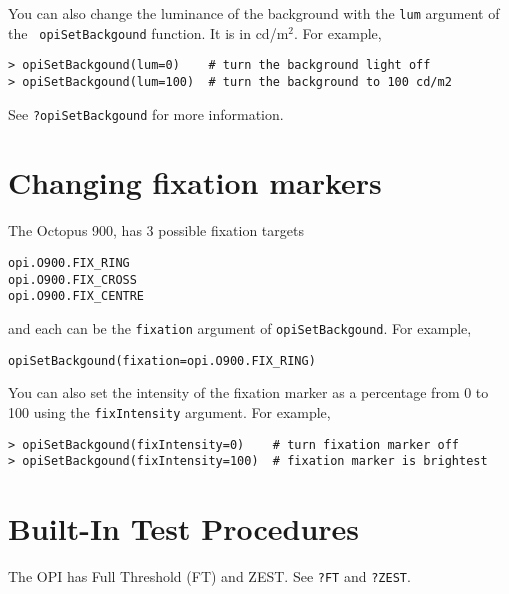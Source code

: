 \documentclass{article}
\begin{document}
You can also change the luminance of the background with the {\tt lum} argument of the {\tt
opiSetBackgound} function. It is in cd/m$^2$.
For example,
\begin{verbatim}
> opiSetBackgound(lum=0)    # turn the background light off
> opiSetBackgound(lum=100)  # turn the background to 100 cd/m2
\end{verbatim}
See {\tt ?opiSetBackgound} for more information.

\section{Changing fixation markers}

The Octopus 900, has 3 possible fixation targets
\begin{verbatim}
opi.O900.FIX_RING
opi.O900.FIX_CROSS
opi.O900.FIX_CENTRE
\end{verbatim}
and each can be the {\tt fixation} argument of {\tt opiSetBackgound}. For example, 
\begin{verbatim}
opiSetBackgound(fixation=opi.O900.FIX_RING)
\end{verbatim}

You can also set the intensity of the fixation marker as a percentage from 0 to 100 using the
{\tt fixIntensity} argument. 
For example,
\begin{verbatim}
> opiSetBackgound(fixIntensity=0)    # turn fixation marker off
> opiSetBackgound(fixIntensity=100)  # fixation marker is brightest
\end{verbatim}

\section{Built-In Test Procedures}

The OPI has Full Threshold (FT) and ZEST.
See {\tt ?FT} and {\tt ?ZEST}.


\end{document}
